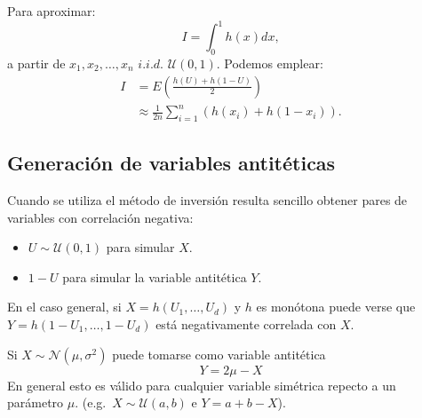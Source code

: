 \documentclass[
  spanish,
  10pt,
]{book}
\theoremstyle{break}
\theoremstyle{nonumberplain}
\begin{document}
Para aproximar:
\[I=\int_{0}^{1}h\left(  x\right) dx,\]
a partir de \(x_{1},x_{2},\ldots,x_{n}\) \(i.i.d.\)
\(\mathcal{U}\left(0,1\right)\).
Podemos emplear:
\[\begin{aligned}
    I  & =E\left(  \frac{h\left(  U\right)  +h\left(  1-U\right)  }{2}\right) \\
    & \approx \frac{1}{2n}\sum \limits_{i=1}^{n}\left(  h\left(  x_{i}\right)
    +h\left(  1-x_{i}\right)  \right).
\end{aligned}\]

\subsection{Generación de variables antitéticas}\label{generaciuxf3n-de-variables-antituxe9ticas}

Cuando se utiliza el método de inversión resulta sencillo obtener
pares de variables con correlación negativa:

\begin{itemize}
\item
  \(U\sim \mathcal{U}\left(  0,1\right)\) para simular \(X\).
\item
  \(1-U\) para simular la variable antitética \(Y\).
\end{itemize}

En el caso general, si \(X=h\left(  U_{1},\ldots,U_{d}\right)\) y
\(h\) es monótona puede verse \citep[e.g.][]{ross1999} que
\(Y=h\left(  1-U_{1},\ldots,1-U_{d}\right)\) está negativamente
correlada con \(X\).

Si \(X\sim \mathcal{N}(\mu,\sigma^2)\) puede tomarse como variable
antitética \[Y=2\mu-X\]
En general esto es válido para cualquier variable
simétrica repecto a un parámetro \(\mu\).
(e.g.~\(X\sim \mathcal{U}(a,b)\) e \(Y=a+b-X\)).
\end{document}
